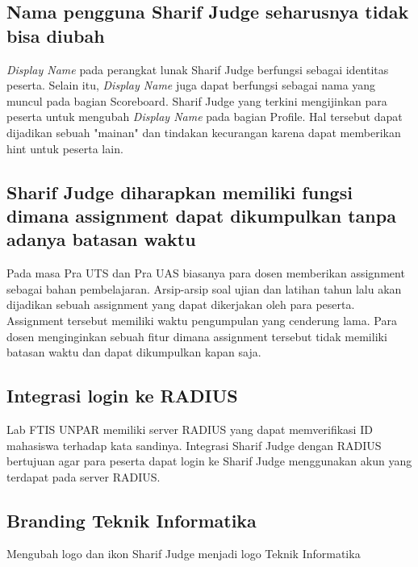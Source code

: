 \subsection{Nama pengguna Sharif Judge seharusnya tidak bisa diubah}
\textit{Display Name} pada perangkat lunak Sharif Judge berfungsi sebagai identitas peserta. Selain itu, \textit{Display Name} juga dapat berfungsi sebagai nama yang muncul pada bagian Scoreboard. Sharif Judge yang terkini mengijinkan para peserta untuk mengubah \textit{Display Name} pada bagian Profile. Hal tersebut dapat dijadikan sebuah "mainan" dan tindakan kecurangan karena dapat memberikan hint untuk peserta lain.

\subsection{Sharif Judge diharapkan memiliki fungsi dimana assignment dapat dikumpulkan tanpa adanya batasan waktu}
Pada masa Pra UTS dan Pra UAS biasanya para dosen memberikan assignment sebagai bahan pembelajaran. Arsip-arsip soal ujian dan latihan tahun lalu akan dijadikan sebuah assignment yang dapat dikerjakan oleh para peserta. Assignment tersebut memiliki waktu pengumpulan yang cenderung lama. Para dosen menginginkan sebuah fitur dimana assignment tersebut tidak memiliki batasan waktu dan dapat dikumpulkan kapan saja.

\subsection{Integrasi login ke RADIUS}
Lab FTIS UNPAR memiliki server RADIUS yang dapat memverifikasi ID mahasiswa terhadap kata sandinya. Integrasi Sharif Judge dengan RADIUS bertujuan agar para peserta dapat login ke Sharif Judge menggunakan akun yang terdapat pada server RADIUS.

\subsection{Branding Teknik Informatika}
Mengubah logo dan ikon Sharif Judge menjadi logo Teknik Informatika


